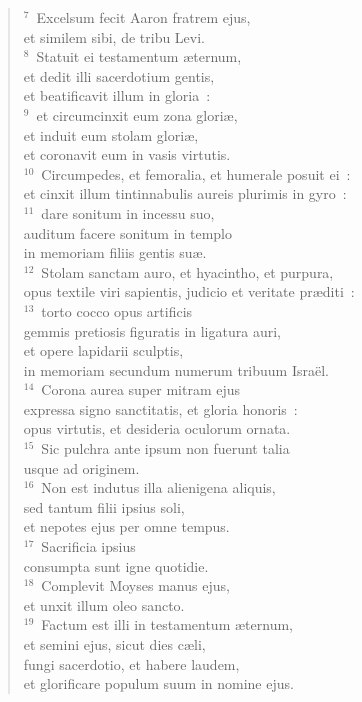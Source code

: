 \begin{verse}${}^{7}$~Excelsum fecit Aaron fratrem ejus,\\ et similem sibi, de tribu Levi.\\
${}^{8}$~Statuit ei testamentum \ae ternum,\\ et dedit illi sacerdotium gentis,\\ et beatificavit illum in gloria~:\\
${}^{9}$~et circumcinxit eum zona glori\ae ,\\ et induit eum stolam glori\ae ,\\ et coronavit eum in vasis virtutis.\\
${}^{10}$~Circumpedes, et femoralia, et humerale posuit ei~:\\ et cinxit illum tintinnabulis aureis plurimis in gyro~:\\
${}^{11}$~dare sonitum in incessu suo,\\ auditum facere sonitum in templo\\ in memoriam filiis gentis su\ae .\\
${}^{12}$~Stolam sanctam auro, et hyacintho, et purpura,\\ opus textile viri sapientis, judicio et veritate pr\ae diti~:\\
${}^{13}$~torto cocco opus artificis\\ gemmis pretiosis figuratis in ligatura auri,\\ et opere lapidarii sculptis,\\ in memoriam secundum numerum tribuum Isra\"el.\\
${}^{14}$~Corona aurea super mitram ejus\\ expressa signo sanctitatis, et gloria honoris~:\\ opus virtutis, et desideria oculorum ornata.\\
${}^{15}$~Sic pulchra ante ipsum non fuerunt talia\\ usque ad originem.\\
${}^{16}$~Non est indutus illa alienigena aliquis,\\ sed tantum filii ipsius soli,\\ et nepotes ejus per omne tempus.\\
${}^{17}$~Sacrificia ipsius\\ consumpta sunt igne quotidie.\\
${}^{18}$~Complevit Moyses manus ejus,\\ et unxit illum oleo sancto.\\
${}^{19}$~Factum est illi in testamentum \ae ternum,\\ et semini ejus, sicut dies c\ae li,\\ fungi sacerdotio, et habere laudem,\\ et glorificare populum suum in nomine ejus.\\

\end{verse}
